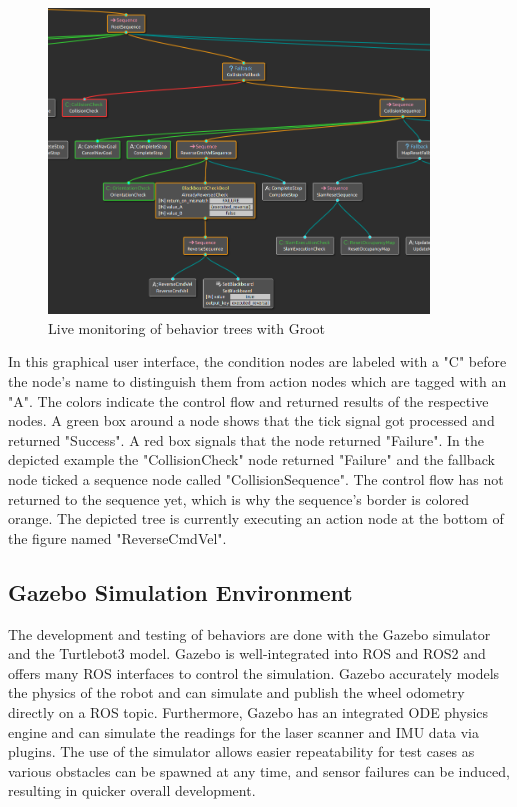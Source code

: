 \begin{figure}[ht]
	\centering 
	\includegraphics[width=0.9\textwidth]{images/groot.png}
	\caption{Live monitoring of behavior trees with Groot}
	\label{fig:groot}
\end{figure}

In this graphical user interface, the condition nodes are labeled with a "C" before the node's name to distinguish them from action nodes which are tagged with an "A". The colors indicate the control flow and returned results of the respective nodes. A green box around a node shows that the tick signal got processed and returned "Success". A red box signals that the node returned "Failure". In the depicted example the "CollisionCheck" node returned "Failure" and the fallback node ticked a sequence node called "CollisionSequence". The control flow has not returned to the sequence yet, which is why the sequence's border is colored orange. The depicted tree is currently executing an action node at the bottom of the figure named "ReverseCmdVel".  

\subsection{Gazebo Simulation Environment}

The development and testing of behaviors are done with the Gazebo simulator and the Turtlebot3 model. Gazebo is well-integrated into ROS and ROS2 and offers many ROS interfaces to control the simulation. Gazebo accurately models the physics of the robot and can simulate and publish the wheel odometry directly on a ROS topic. Furthermore, Gazebo has an integrated ODE physics engine and can simulate the readings for the laser scanner and IMU data via plugins. The use of the simulator allows easier repeatability for test cases as various obstacles can be spawned at any time, and sensor failures can be induced, resulting in quicker overall development.

